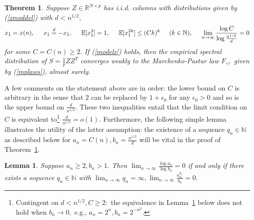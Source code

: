 \documentclass{article}
\newtheorem{lemma}{Lemma}
\newtheorem{theorem}{Theorem}
\numberwithin{equation}{section}
\begin{document}
\begin{theorem}\label{mainth}
Suppose \(Z \in \mathbb{R}^{N \times p}\) has i.i.d. columns with distributions given by (\ref{zmoddel}) with \(d<n^{1/2},\)
\[x_1=x(n), \hspace{0.5cm} x_1 \overset{d}{=} -x_1,\hspace{0.5cm} \mathbb{E}[x_1^2]=1, \hspace{0.5cm} \mathbb{E}[x_1^{2k}] \leq (Ck)^k \hspace{0.5cm} (k \in \mathbb{N}), \hspace{0.5cm} \lim_{n \to \infty}{\frac{\log{C}}{\log{\frac{n^{1/2}}{d}}}}=0\]
for some \(C=C(n) \geq 2.\)
If (\ref{modelz}) holds, %
then the empirical spectral distribution of \(S=\frac{1}{p}ZZ^T\) converges weakly to the Marchenko-Pastur law \(F_{\gamma},\) given by (\ref{mplaws}), %
almost surely.
\end{theorem}

\par
A few comments on the statement above are in order: the lower bound on \(C\) is arbitrary in the sense that \(2\) can be replaced by \(1+\epsilon_0\) for any \(\epsilon_0>0\) and so is the upper bound on \(\frac{d}{n^{1/2}}.\) These two inequalities entail that the limit condition on \(C\) is equivalent to\footnote{Contingent on \(d<n^{1/2},C \geq 2:\) the equivalence in Lemma~\ref{lemmaequiv} below does not hold when \(b_n \to 0,\) e.g., \(a_n=2^n,b_n=2^{-n^2}.\)} \(\frac{d}{n^{1/2}}=o(1).\) %
Furthermore, the following simple lemma illustrates the utility of the latter assumption: %
the existence of a sequence \(q_n \in \mathbb{N}\) as described below for \(a_n=C(n),b_n=\frac{n^{1/2}}{d}\) will be vital in the proof of Theorem~\ref{mainth}.

\begin{lemma}\label{lemmaequiv}
    Suppose \(a_n \geq 2, b_n >1.\) Then \(\lim_{n \to \infty}{\frac{\log{a_n}}{\log{b_n}}}=0\) if and only if there exists a sequence \(q_n \in \mathbb{N}\) with \(\lim_{n \to \infty}{q_n}=\infty, \lim_{n \to \infty}{\frac{a_n^{q_n}}{b_n}}=0.\)
\end{lemma}
\end{document}
